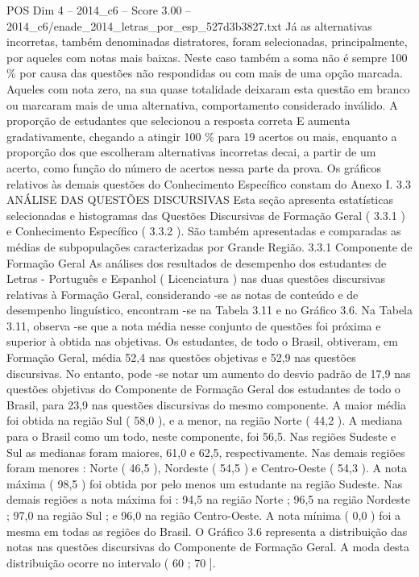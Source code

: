 \begin{textsample}{POS Dim 4 – 2014\_c6 – Score 3.00 – 2014\_c6/enade\_2014\_letras\_por\_esp\_527d3b3827.txt}
Já as alternativas incorretas, também denominadas distratores, foram selecionadas, principalmente, por aqueles com notas mais baixas.
Neste caso também a soma não é sempre 100 \% por causa das questões não respondidas ou com mais de uma opção marcada.
Aqueles com nota zero, na sua quase totalidade deixaram esta questão em branco ou marcaram mais de uma alternativa, comportamento considerado inválido.
A proporção de estudantes que selecionou a resposta correta E aumenta gradativamente, chegando a atingir 100 \% para 19 acertos ou mais, enquanto a proporção dos que escolheram alternativas incorretas decai, a partir de um acerto, como função do número de acertos nessa parte da prova.
Os gráficos relativos às demais questões do Conhecimento Específico constam do Anexo I. 3.3 ANÁLISE DAS QUESTÕES DISCURSIVAS Esta seção apresenta estatísticas selecionadas e histogramas das Questões Discursivas de Formação Geral ( 3.3.1 ) e Conhecimento Específico ( 3.3.2 ).
São também apresentadas e comparadas as médias de subpopulações caracterizadas por Grande Região. 3.3.1 Componente de Formação Geral As análises dos resultados de desempenho dos estudantes de Letras - Português e Espanhol ( Licenciatura ) nas duas questões discursivas relativas à Formação Geral, considerando -se as notas de conteúdo e de desempenho linguístico, encontram -se na Tabela 3.11 e no Gráfico 3.6.
Na Tabela 3.11, observa -se que a nota média nesse conjunto de questões foi próxima e superior à obtida nas objetivas.
Os estudantes, de todo o Brasil, obtiveram, em Formação Geral, média 52,4 nas questões objetivas e 52,9 nas questões discursivas.
No entanto, pode -se notar um aumento do desvio padrão de 17,9 nas questões objetivas do Componente de Formação Geral dos estudantes de todo o Brasil, para 23,9 nas questões discursivas do mesmo componente.
A maior média foi obtida na região Sul ( 58,0 ), e a menor, na região Norte ( 44,2 ).
A mediana para o Brasil como um todo, neste componente, foi 56,5.
Nas regiões Sudeste e Sul as medianas foram maiores, 61,0 e 62,5, respectivamente.
Nas demais regiões foram menores : Norte ( 46,5 ), Nordeste ( 54,5 ) e Centro-Oeste ( 54,3 ).
A nota máxima ( 98,5 ) foi obtida por pelo menos um estudante na região Sudeste.
Nas demais regiões a nota máxima foi : 94,5 na região Norte ; 96,5 na região Nordeste ; 97,0 na região Sul ; e 96,0 na região Centro-Oeste.
A nota mínima ( 0,0 ) foi a mesma em todas as regiões do Brasil.
O Gráfico 3.6 representa a distribuição das notas nas questões discursivas do Componente de Formação Geral.
A moda desta distribuição ocorre no intervalo ( 60 ; 70 ].

\end{textsample}
